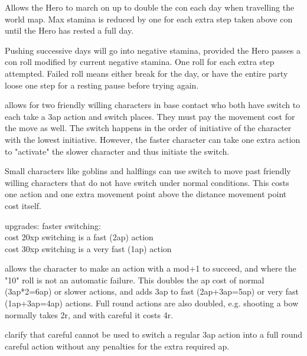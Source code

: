 

Allows the Hero to march on up to double the con each day when travelling the world map. Max stamina is reduced by one for each extra step taken above con until the Hero has rested a full day.

Pushing successive days will go into negative stamina, provided the Hero passes a con roll modified by current negative stamina. One roll for each extra step attempted. Failed roll means either break for the day, or have the entire party loose one step for a resting pause before trying again.


 allows for two friendly willing characters in base contact who both have switch to each take a 3ap action and switch places. They must pay the movement cost for the move as well. The switch happens in the order of initiative of the character with the lowest initiative. However, the faster character can take one extra action to "activate" the slower character and thus initiate the switch.

Small characters like goblins and halflings can use switch to move past friendly willing characters that do not have switch under normal conditions. This costs one action and one extra movement point above the distance movement point cost itself. 


upgrades: faster switching: \\
cost 20xp switching is a fast (2ap) action \\
cost 30xp switching is a very fast (1ap) action


 allows the character to make an action with a mod+1 to succeed, and where the "10" roll is not an automatic failure.
This doubles the ap cost of normal (3ap*2=6ap) or slower actions, and adds 3ap to fast (2ap+3ap=5ap) or very fast (1ap+3ap=4ap) actions.
Full round actions are also doubled, e.g. shooting a bow normally takes 2r, and with careful it costs 4r.

\todo clarify that careful cannot be used to switch a regular 3ap action into a full round careful action without any penalties for the extra required ap.



